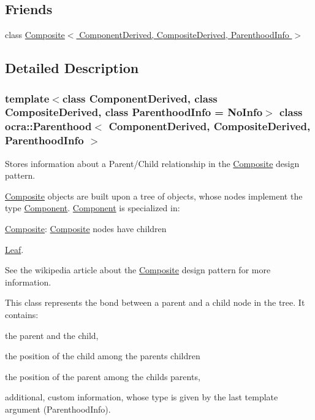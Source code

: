 \subsection*{Friends}
\begin{DoxyCompactItemize}
\item 
class \hyperlink{classocra_1_1Parenthood_a157fe78169803ffbbb7290a687e96f5e}{Composite$<$ Component\+Derived, Composite\+Derived, Parenthood\+Info $>$}
\end{DoxyCompactItemize}


\subsection{Detailed Description}
\subsubsection*{template$<$class Component\+Derived, class Composite\+Derived, class Parenthood\+Info = No\+Info$>$\newline
class ocra\+::\+Parenthood$<$ Component\+Derived, Composite\+Derived, Parenthood\+Info $>$}

Stores information about a Parent/\+Child relationship in the \hyperlink{classocra_1_1Composite}{Composite} design pattern. 

\hyperlink{classocra_1_1Composite}{Composite} objects are built upon a tree of objects, whose nodes implement the type \hyperlink{classocra_1_1Component}{Component}. \hyperlink{classocra_1_1Component}{Component} is specialized in\+:
\begin{DoxyItemize}
\item \hyperlink{classocra_1_1Composite}{Composite}\+: \hyperlink{classocra_1_1Composite}{Composite} nodes have children
\item \hyperlink{classocra_1_1Leaf}{Leaf}.
\end{DoxyItemize}

See the wikipedia article about the \hyperlink{classocra_1_1Composite}{Composite} design pattern for more information.

This class represents the bond between a parent and a child node in the tree. It contains\+:
\begin{DoxyItemize}
\item the parent and the child,
\item the position of the child among the parent\textquotesingle{}s children
\item the position of the parent among the child\textquotesingle{}s parents,
\item additional, custom information, whose type is given by the last template argument (Parenthood\+Info).
\end{DoxyItemize}

